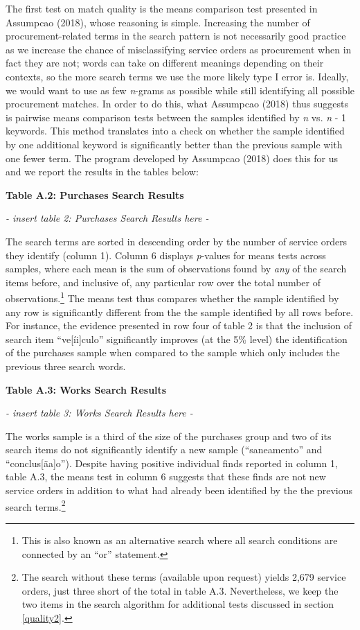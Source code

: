 \documentclass[]{article}
\let\rmarkdownfootnote\footnote%
\def\footnote{\protect\rmarkdownfootnote}
\theoremstyle{definition}
\theoremstyle{definition}
\theoremstyle{definition}
\theoremstyle{remark}
\begin{document}
The first test on match quality is the means comparison test presented
in Assumpcao (2018), whose reasoning is simple. Increasing the number of
procurement-related terms in the search pattern is not necessarily good
practice as we increase the chance of misclassifying service orders as
procurement when in fact they are not; words can take on different
meanings depending on their contexts, so the more search terms we use
the more likely type I error is. Ideally, we would want to use as few
\emph{n}-grams as possible while still identifying all possible
procurement matches. In order to do this, what Assumpcao (2018) thus
suggests is pairwise means comparison tests between the samples
identified by \emph{n} vs. \emph{n} - 1 keywords. This method translates
into a check on whether the sample identified by one additional keyword
is significantly better than the previous sample with one fewer term.
The program developed by Assumpcao (2018) does this for us and we report
the results in the tables below:

\textbf{Table A.2: Purchases Search Results}

\emph{- insert table 2: Purchases Search Results here -}

The search terms are sorted in descending order by the number of service
orders they identify (column 1). Column 6 displays \emph{p}-values for
means tests across samples, where each mean is the sum of observations
found by \emph{any} of the search items before, and inclusive of, any
particular row over the total number of observations.\footnote{This is
  also known as an alternative search where all search conditions are
  connected by an ``or'' statement.} The means test thus compares
whether the sample identified by any row is significantly different from
the the sample identified by all rows before. For instance, the evidence
presented in row four of table 2 is that the inclusion of search item
``ve{[}íi{]}culo'' significantly improves (at the 5\% level) the
identification of the purchases sample when compared to the sample which
only includes the previous three search words.

\textbf{Table A.3: Works Search Results}

\emph{- insert table 3: Works Search Results here -}

The works sample is a third of the size of the purchases group and two
of its search items do not significantly identify a new sample
(``saneamento'' and ``conclus{[}ãa{]}o''). Despite having positive
individual finds reported in column 1, table A.3, the means test in
column 6 suggests that these finds are not new service orders in
addition to what had already been identified by the the previous search
terms.\footnote{The search without these terms (available upon request)
  yields 2,679 service orders, just three short of the total in table
  A.3. Nevertheless, we keep the two items in the search algorithm for
  additional tests discussed in section \ref{quality2}.}
\end{document}
